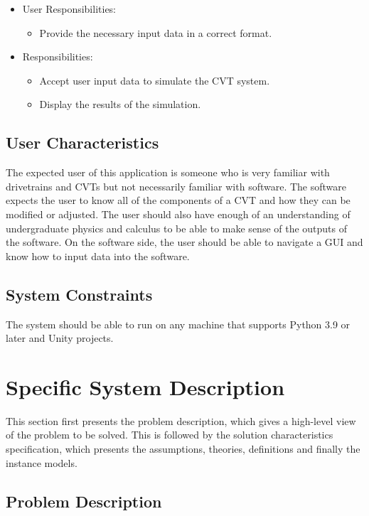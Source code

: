 \documentclass[12pt]{article}
\begin{document}
\begin{itemize}
\item User Responsibilities:
\begin{itemize}
\item Provide the necessary input data in a correct format.
\end{itemize}
\item \progname{} Responsibilities:
\begin{itemize}
\item Accept user input data to simulate the CVT system.
\item Display the results of the simulation.
\end{itemize}
\end{itemize}

\subsection{User Characteristics} \label{SecUserCharacteristics}

The expected user of this application is someone who is very familiar with drivetrains and CVTs but not necessarily familiar with software.
The software expects the user to know all of the components of a CVT and how they can be modified or adjusted.
The user should also have enough of an understanding of undergraduate physics and calculus to be able to make sense of the outputs of the software.
On the software side, the user should be able to navigate a GUI and know how to input data into the software.

\subsection{System Constraints}

The system should be able to run on any machine that supports Python 3.9 or later and Unity projects.

\section{Specific System Description}

This section first presents the problem description, which gives a high-level
view of the problem to be solved.  This is followed by the solution characteristics
specification, which presents the assumptions, theories, definitions and finally
the instance models. 

\subsection{Problem Description} \label{Sec_pd}
\end{document}
